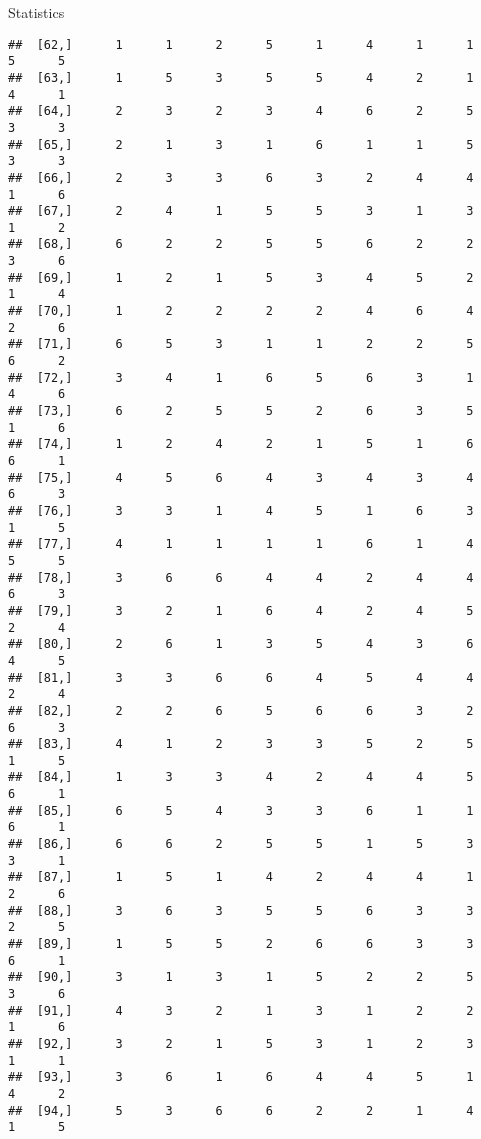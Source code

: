 \documentclass[
  ignorenonframetext,
]{beamer}
\begin{document}
\begin{frame}[fragile]{Statistics}
\begin{verbatim}
##  [62,]      1      1      2      5      1      4      1      1      5      5
##  [63,]      1      5      3      5      5      4      2      1      4      1
##  [64,]      2      3      2      3      4      6      2      5      3      3
##  [65,]      2      1      3      1      6      1      1      5      3      3
##  [66,]      2      3      3      6      3      2      4      4      1      6
##  [67,]      2      4      1      5      5      3      1      3      1      2
##  [68,]      6      2      2      5      5      6      2      2      3      6
##  [69,]      1      2      1      5      3      4      5      2      1      4
##  [70,]      1      2      2      2      2      4      6      4      2      6
##  [71,]      6      5      3      1      1      2      2      5      6      2
##  [72,]      3      4      1      6      5      6      3      1      4      6
##  [73,]      6      2      5      5      2      6      3      5      1      6
##  [74,]      1      2      4      2      1      5      1      6      6      1
##  [75,]      4      5      6      4      3      4      3      4      6      3
##  [76,]      3      3      1      4      5      1      6      3      1      5
##  [77,]      4      1      1      1      1      6      1      4      5      5
##  [78,]      3      6      6      4      4      2      4      4      6      3
##  [79,]      3      2      1      6      4      2      4      5      2      4
##  [80,]      2      6      1      3      5      4      3      6      4      5
##  [81,]      3      3      6      6      4      5      4      4      2      4
##  [82,]      2      2      6      5      6      6      3      2      6      3
##  [83,]      4      1      2      3      3      5      2      5      1      5
##  [84,]      1      3      3      4      2      4      4      5      6      1
##  [85,]      6      5      4      3      3      6      1      1      6      1
##  [86,]      6      6      2      5      5      1      5      3      3      1
##  [87,]      1      5      1      4      2      4      4      1      2      6
##  [88,]      3      6      3      5      5      6      3      3      2      5
##  [89,]      1      5      5      2      6      6      3      3      6      1
##  [90,]      3      1      3      1      5      2      2      5      3      6
##  [91,]      4      3      2      1      3      1      2      2      1      6
##  [92,]      3      2      1      5      3      1      2      3      1      1
##  [93,]      3      6      1      6      4      4      5      1      4      2
##  [94,]      5      3      6      6      2      2      1      4      1      5

\end{verbatim}
\end{frame}
\end{document}
